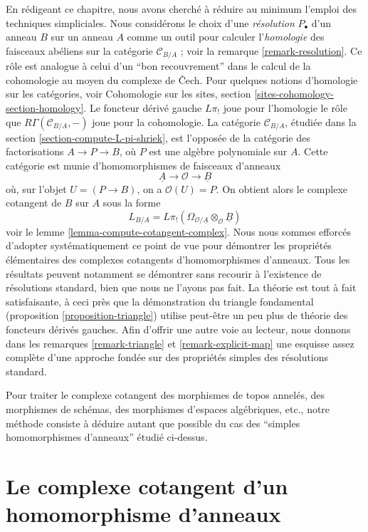 \noindent
En rédigeant ce chapitre, nous avons cherché à réduire au minimum l'emploi
des techniques simpliciales. Nous considérons le choix d'une
{\it résolution} $P_\bullet$ d'un anneau $B$ sur un anneau $A$ comme un outil
pour calculer l'{\it homologie} des faisceaux abéliens sur la catégorie
$\mathcal{C}_{B/A}$ ; voir la remarque \ref{remark-resolution}. Ce rôle est
analogue à celui d'un ``bon recouvrement'' dans le calcul de la cohomologie au
moyen du complexe de {\v C}ech. Pour quelques notions d'homologie sur les
catégories, voir Cohomologie sur les sites, section
\ref{sites-cohomology-section-homology}. Le foncteur dérivé gauche $L\pi_!$
joue pour l'homologie le rôle que $R\Gamma(\mathcal{C}_{B/A}, -)$ joue pour
la cohomologie. La catégorie $\mathcal{C}_{B/A}$, étudiée dans la section
\ref{section-compute-L-pi-shriek}, est l'opposée de la catégorie des
factorisations $A \to P \to B$, où $P$ est une algèbre polynomiale sur $A$.
Cette catégorie est munie d'homomorphismes de faisceaux d'anneaux
$$
\underline{A} \longrightarrow \mathcal{O} \longrightarrow \underline{B}
$$
où, sur l'objet $U =  (P \to B)$, on a $\mathcal{O}(U) = P$.
On obtient alors le complexe cotangent de $B$ sur $A$ sous la forme
$$
L_{B/A} =
L\pi_!(\Omega_{\mathcal{O}/\underline{A}} \otimes_\mathcal{O} \underline{B})
$$
voir le lemme \ref{lemma-compute-cotangent-complex}. Nous nous sommes efforcés
d'adopter systématiquement ce point de vue pour démontrer les propriétés
élémentaires des complexes cotangents d'homomorphismes d'anneaux. Tous les
résultats peuvent notamment se démontrer sans recourir à l'existence de
résolutions standard, bien que nous ne l'ayons pas fait. La théorie est tout à
fait satisfaisante, à ceci près que la démonstration du triangle fondamental
(proposition \ref{proposition-triangle}) utilise peut-être un peu plus de
théorie des foncteurs dérivés gauches. Afin d'offrir une autre voie au
lecteur, nous donnons dans les remarques \ref{remark-triangle} et
\ref{remark-explicit-map} une esquisse assez complète d'une approche fondée
sur des propriétés simples des résolutions standard.

\medskip\noindent
Pour traiter le complexe cotangent des morphismes de topos annelés, des
morphismes de schémas, des morphismes d'espaces algébriques, etc., notre
méthode consiste à déduire autant que possible du cas des ``simples
homomorphismes d'anneaux'' étudié ci-dessus.





\section{Le complexe cotangent d'un homomorphisme d'anneaux}
\label{section-cotangent-ring-map}

